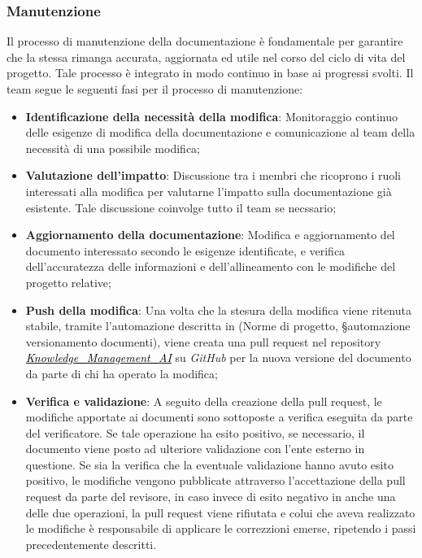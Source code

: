 \documentclass[10pt, a4paper]{article}
\begin{document}
\subsubsection{Manutenzione}
Il processo di manutenzione della documentazione è fondamentale per garantire che la stessa rimanga accurata, aggiornata ed utile nel corso del ciclo di vita del progetto. Tale processo è integrato in modo continuo in base ai progressi svolti. Il team segue le seguenti fasi per il processo di manutenzione:
\begin{itemize}
    \item \textbf{Identificazione della necessità della modifica}: Monitoraggio continuo delle esigenze di modifica della documentazione e 
    comunicazione al team della necessità di una possibile modifica;
    \item \textbf{Valutazione dell'impatto}: Discussione tra i membri che ricoprono i ruoli interessati alla modifica per valutarne l'impatto 
    sulla documentazione già esistente. Tale discussione coinvolge tutto il team se necssario;
    \item \textbf{Aggiornamento della documentazione}: Modifica e aggiornamento del documento interessato secondo le esigenze identificate, e 
    verifica dell'accuratezza delle informazioni e dell'allineamento con le  modifiche del progetto relative;
    \item \textbf{Push della modifica}: Una volta che la stesura della modifica viene ritenuta stabile, tramite l'automazione descritta in 
    (Norme di progetto, \S automazione versionamento documenti),
    viene creata una pull request nel repository \href{https://github.com/sweetcode-team/Knowledge_Management_AI}{\textcolor{black}{\textit{Knowledge\_Management\_AI}}} 
    su \textit{GitHub} per la nuova versione del documento da parte di chi ha operato la modifica;
    \item \textbf{Verifica e validazione}: A seguito della creazione della pull request, le modifiche apportate ai documenti sono sottoposte a
    verifica eseguita da parte del verificatore. Se tale operazione ha esito positivo, se necessario, il documento viene posto ad ulteriore validazione
    con l'ente esterno in questione.
    Se sia la verifica che la eventuale validazione hanno avuto esito positivo, le modifiche vengono pubblicate attraverso l'accettazione della 
    pull request da parte del revisore, in caso invece di esito negativo in anche una delle due operazioni, la pull request viene rifiutata e colui 
    che aveva realizzato le modifiche è responsabile di applicare le correzzioni emerse, ripetendo i passi precedentemente descritti.
\end{itemize}
\end{document}
